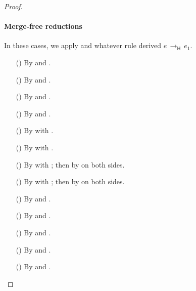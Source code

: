 \documentclass[9pt]{extarticle}
\newcommand{\ottnt}[1]{\mathit{#1}}
\begin{document}
{\begin{lemma}
\begin{proof}
{    \paragraph{Merge-free reductions}
In these cases, we apply  and whatever rule
    derived $\ottnt{e} \,  \longrightarrow _{  \mathsf{H}  }  \, \ottnt{e_{{\mathrm{1}}}}$.
\begin{itemize}
    \item[(\E{Beta})] By  and .
    \item[(\E{Op})] By  and .
    \item[(\E{Unwrap})] By  and .
    \item[(\E{TypeSet})] By  and .
    \item[(\E{AppL})] By  with .
    \item[(\E{AppR})] By  with .
    \item[(\E{AppRaiseL})] By  with ; then
      by  on both sides.
    \item[(\E{AppRaiseR})] By  with ; then
      by  on both sides.
    \item[(\E{CheckOK})] By  and .
    \item[(\E{CheckFail})] By  and .
    \item[(\E{CheckFail})] By  and .
    \item[(\E{OpInner})] By  and .
    \item[(\E{OpRaise})] By  and .

    \end{itemize}

}
\end{proof}
\end{lemma}}
\end{document}
